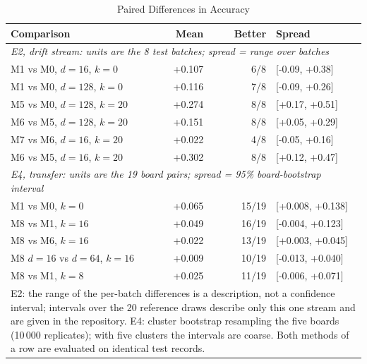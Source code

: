 \begin{table}[t]
\caption{Paired Differences in Accuracy}
\label{tab:stats}\centering\scriptsize\setlength{\tabcolsep}{2pt}
\begin{tabular}{l r r l}\toprule
Comparison & Mean & Better & Spread\\\midrule
\multicolumn{4}{l}{\emph{E2, drift stream: units are the 8 test batches; spread = range over batches}}\\
M1 vs M0, $d=16$, $k=0$ & +0.107 & 6/8 & [-0.09, +0.38]\\
M1 vs M0, $d=128$, $k=0$ & +0.116 & 7/8 & [-0.09, +0.26]\\
M5 vs M0, $d=128$, $k=20$ & +0.274 & 8/8 & [+0.17, +0.51]\\
M6 vs M5, $d=128$, $k=20$ & +0.151 & 8/8 & [+0.05, +0.29]\\
M7 vs M6, $d=16$, $k=20$ & +0.022 & 4/8 & [-0.05, +0.16]\\
M6 vs M5, $d=16$, $k=20$ & +0.302 & 8/8 & [+0.12, +0.47]\\
\multicolumn{4}{l}{\emph{E4, transfer: units are the 19 board pairs; spread = 95\% board-bootstrap interval}}\\
M1 vs M0, $k=0$ & +0.065 & 15/19 & [+0.008, +0.138]\\
M8 vs M1, $k=16$ & +0.049 & 16/19 & [-0.004, +0.123]\\
M8 vs M6, $k=16$ & +0.022 & 13/19 & [+0.003, +0.045]\\
M8 $d=16$ vs $d=64$, $k=16$ & +0.009 & 10/19 & [-0.013, +0.040]\\
M8 vs M1, $k=8$ & +0.025 & 11/19 & [-0.006, +0.071]\\
\bottomrule
\multicolumn{4}{p{0.95\columnwidth}}{\scriptsize E2: the range of the per-batch differences is a description, not a confidence interval; intervals over the 20 reference draws describe only this one stream and are given in the repository. E4: cluster bootstrap resampling the five boards (10\,000 replicates); with five clusters the intervals are coarse. Both methods of a row are evaluated on identical test records.}
\end{tabular}
\end{table}
